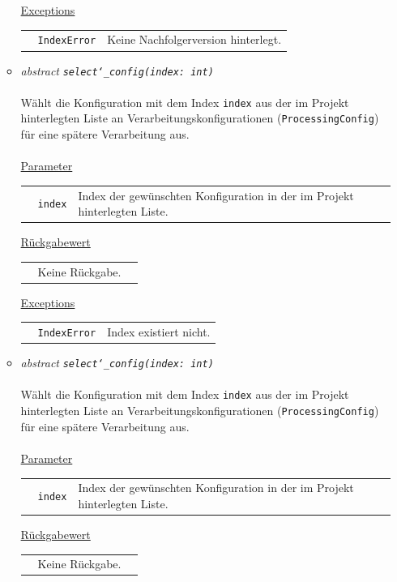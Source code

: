 \documentclass{article}
\begin{document}
\begin{itemize}
\begin{itemize}
\underline{Exceptions}\\
\begin{tabular}{lll}
 & \texttt{IndexError} & Keine Nachfolgerversion hinterlegt.\\
\end{tabular}


\item \textit{\flqq{}abstract\frqq} \texttt{\textit{select\char`_config(index: int)}}\\\\
Wählt die Konfiguration mit dem Index \texttt{index} aus der im Projekt hinterlegten Liste an Verarbeitungskonfigurationen (\texttt{ProcessingConfig}) für eine spätere Verarbeitung aus.
\\\\
\underline{Parameter}\\
\begin{tabular}{lll}
 & \texttt{index} & Index der gewünschten Konfiguration in der im Projekt hinterlegten Liste.
\end{tabular}

\underline{Rückgabewert}\\
\begin{tabular}{lll}
 & Keine Rückgabe.\\
\end{tabular}

\underline{Exceptions}\\
\begin{tabular}{lll}
 & \texttt{IndexError} & Index existiert nicht.\\
\end{tabular}

\item \textit{\flqq{}abstract\frqq} \texttt{\textit{select\char`_config(index: int)}}\\\\
Wählt die Konfiguration mit dem Index \texttt{index} aus der im Projekt hinterlegten Liste an Verarbeitungskonfigurationen (\texttt{ProcessingConfig}) für eine spätere Verarbeitung aus.
\\\\
\underline{Parameter}\\
\begin{tabular}{lll}
 & \texttt{index} & Index der gewünschten Konfiguration in der im Projekt hinterlegten Liste.
\end{tabular}

\underline{Rückgabewert}\\
\begin{tabular}{lll}
 & Keine Rückgabe.\\
\end{tabular}


\end{itemize}
\end{itemize}
\end{document}
